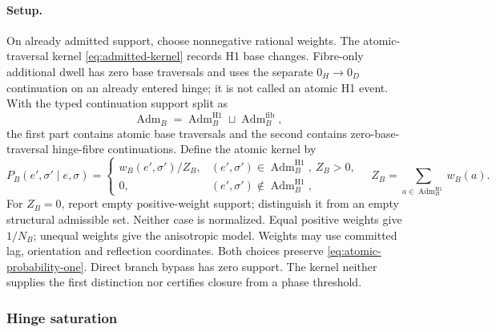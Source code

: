 \paragraph{Setup.}
On already admitted support, choose nonnegative rational weights. The atomic-traversal kernel \eqref{eq:admitted-kernel} records H1 base changes. Fibre-only additional dwell has zero base traversals and uses the separate \(0_H\to0_D\) continuation on an already entered hinge; it is not called an atomic H1 event. With
the typed continuation support split as
\begin{equation}
\operatorname{Adm}_B=
\operatorname{Adm}^{\mathrm{H1}}_B\sqcup\operatorname{Adm}^{\mathrm{fib}}_B,
\label{eq:continuation-domain-split}
\end{equation}
the first part contains atomic base traversals and the second contains
zero-base-traversal hinge-fibre continuations. Define the atomic kernel by
\begin{equation}
P_B(e',\sigma'\mid e,\sigma)=
\begin{cases}
w_B(e',\sigma')/Z_B,&(e',\sigma')\in\operatorname{Adm}^{\mathrm{H1}}_B,\ Z_B>0,\\
0,&(e',\sigma')\notin\operatorname{Adm}^{\mathrm{H1}}_B,
\end{cases}
\quad Z_B=\sum_{a\in\operatorname{Adm}^{\mathrm{H1}}_B}w_B(a).
\label{eq:admitted-kernel}
\end{equation}
For \(Z_B=0\), report empty positive-weight support; distinguish it from an empty structural admissible set. Neither case is normalized. Equal
positive weights give \(1/N_B\); unequal weights give the anisotropic model.
Weights may use committed lag, orientation and reflection coordinates.
Both choices preserve \eqref{eq:atomic-probability-one}. Direct branch bypass
has zero support. The kernel neither supplies the first distinction nor
certifies closure from a phase threshold.

\subsubsection{Hinge saturation}
